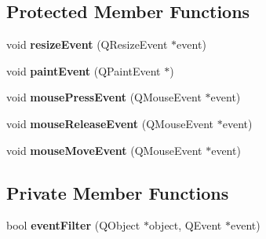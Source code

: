 \subsection*{Protected Member Functions}
\begin{DoxyCompactItemize}
\item 
\hypertarget{classCanvasWidget_a06806e2eda021c884160067a4148dc32}{void {\bfseries resize\-Event} (Q\-Resize\-Event $\ast$event)}\label{classCanvasWidget_a06806e2eda021c884160067a4148dc32}

\item 
\hypertarget{classCanvasWidget_a635c9e389dcdcc25cf218150b6c8a5cc}{void {\bfseries paint\-Event} (Q\-Paint\-Event $\ast$)}\label{classCanvasWidget_a635c9e389dcdcc25cf218150b6c8a5cc}

\item 
\hypertarget{classCanvasWidget_ab3ec45e42dd3da00012f3fb3e01666d4}{void {\bfseries mouse\-Press\-Event} (Q\-Mouse\-Event $\ast$event)}\label{classCanvasWidget_ab3ec45e42dd3da00012f3fb3e01666d4}

\item 
\hypertarget{classCanvasWidget_aa1ddd11ddeb07b7d4f105bf2959ce9bf}{void {\bfseries mouse\-Release\-Event} (Q\-Mouse\-Event $\ast$event)}\label{classCanvasWidget_aa1ddd11ddeb07b7d4f105bf2959ce9bf}

\item 
\hypertarget{classCanvasWidget_a1f0eced3fa450e2a04239b4fe8e3810a}{void {\bfseries mouse\-Move\-Event} (Q\-Mouse\-Event $\ast$event)}\label{classCanvasWidget_a1f0eced3fa450e2a04239b4fe8e3810a}

\end{DoxyCompactItemize}
\subsection*{Private Member Functions}
\begin{DoxyCompactItemize}
\item 
\hypertarget{classCanvasWidget_a4d553688bfcfc791d640d36587f27c26}{bool {\bfseries event\-Filter} (Q\-Object $\ast$object, Q\-Event $\ast$event)}\label{classCanvasWidget_a4d553688bfcfc791d640d36587f27c26}

\end{DoxyCompactItemize}
